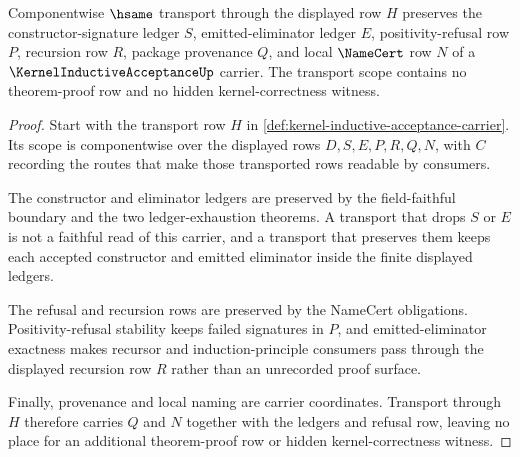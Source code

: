 \begin{theorem}
\label{thm:kernel-inductive-acceptance-hsame-transport-scope}
Componentwise $\hsame$ transport through the displayed row $H$ preserves the constructor-signature ledger $S$, emitted-eliminator ledger $E$, positivity-refusal row $P$, recursion row $R$, package provenance $Q$, and local $\NameCert$ row $N$ of a $\KernelInductiveAcceptanceUp$ carrier. The transport scope contains no theorem-proof row and no hidden kernel-correctness witness.
\end{theorem}
\begin{proof}
Start with the transport row $H$ in \autoref{def:kernel-inductive-acceptance-carrier}. Its scope is componentwise over the displayed rows $D,S,E,P,R,Q,N$, with $C$ recording the routes that make those transported rows readable by consumers.

The constructor and eliminator ledgers are preserved by the field-faithful boundary and the two ledger-exhaustion theorems. A transport that drops $S$ or $E$ is not a faithful read of this carrier, and a transport that preserves them keeps each accepted constructor and emitted eliminator inside the finite displayed ledgers.

The refusal and recursion rows are preserved by the NameCert obligations. Positivity-refusal stability keeps failed signatures in $P$, and emitted-eliminator exactness makes recursor and induction-principle consumers pass through the displayed recursion row $R$ rather than an unrecorded proof surface.

Finally, provenance and local naming are carrier coordinates. Transport through $H$ therefore carries $Q$ and $N$ together with the ledgers and refusal row, leaving no place for an additional theorem-proof row or hidden kernel-correctness witness.
\end{proof}

